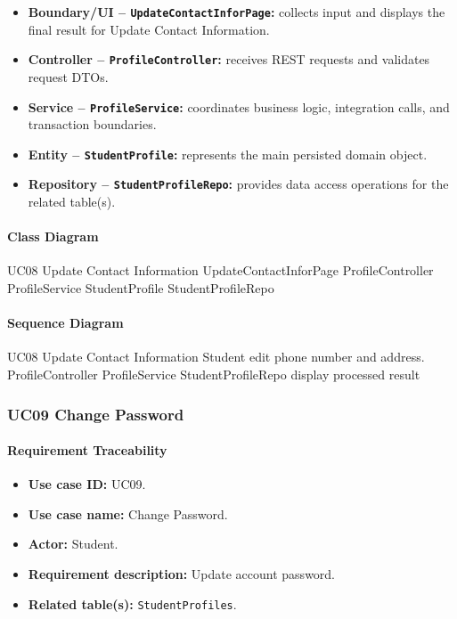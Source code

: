 \begin{itemize}
    \item \textbf{Boundary/UI -- \texttt{UpdateContactInforPage}:} collects input and displays the final result for Update Contact Information.
    \item \textbf{Controller -- \texttt{ProfileController}:} receives REST requests and validates request DTOs.
    \item \textbf{Service -- \texttt{ProfileService}:} coordinates business logic, integration calls, and transaction boundaries.
    \item \textbf{Entity -- \texttt{StudentProfile}:} represents the main persisted domain object.
    \item \textbf{Repository -- \texttt{StudentProfileRepo}:} provides data access operations for the related table(s).
\end{itemize}

\paragraph{Class Diagram}

\ClassDiagram
{UC08 Update Contact Information}
{UpdateContactInforPage}
{ProfileController}
{ProfileService}
{StudentProfile}
{StudentProfileRepo}

\paragraph{Sequence Diagram}

\SequenceDiagram
{UC08 Update Contact Information}
{Student}
{edit phone number and address.}
{ProfileController}
{ProfileService}
{StudentProfileRepo}
{display processed result}

\subsubsection{UC09 Change Password}

\paragraph{Requirement Traceability}

\begin{itemize}
    \item \textbf{Use case ID:} UC09.
    \item \textbf{Use case name:} Change Password.
    \item \textbf{Actor:} Student.
    \item \textbf{Requirement description:} Update account password.
    \item \textbf{Related table(s):} \texttt{StudentProfiles}.
\end{itemize}

